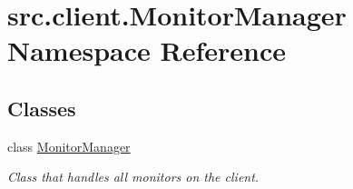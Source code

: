 \hypertarget{namespacesrc_1_1client_1_1_monitor_manager}{\section{src.\-client.\-Monitor\-Manager Namespace Reference}
\label{namespacesrc_1_1client_1_1_monitor_manager}
}
\subsection*{Classes}
\begin{DoxyCompactItemize}
\item 
class \hyperlink{classsrc_1_1client_1_1_monitor_manager_1_1_monitor_manager}{Monitor\-Manager}
\begin{DoxyCompactList}\small\item\em Class that handles all monitors on the client. \end{DoxyCompactList}\end{DoxyCompactItemize}
